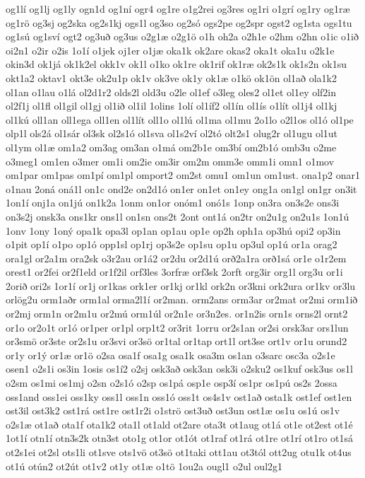 {og1lí
og1lj
og1ly
ogn1d
og1ní
ogr4
og1re
o1g2rei
og3res
og1ri
o1grí
og1ry
og1ræ
og1rö
og3sj
og2ska
og2s1kj
ogs1l
og3so
og2só
ogs2pe
og2spr
ogst2
og1sta
ogs1tu
og1sú
og1sví
ogt2
og3uð
og3us
o2g1æ
o2g1ö
o1h
oh2a
o2h1e
o2hm
o2hn
o1ic
o1ið
oi2n1
o2ir
o2is
1o1í
o1jek
oj1er
o1jæ
oka1k
ok2are
okas2
oka1t
oka1u
o2k1e
okin3d
ok1já
ok1k2el
okk1v
ok1l
o1ko
ok1re
ok1rif
ok1ræ
ok2s1k
ok1s2n
ok1su
okt1a2
oktav1
okt3e
ok2u1p
ok1v
ok3ve
ok1y
ok1æ
o1kö
ok1ön
ol1að
ola1k2
ol1an
o1lau
o1lá
ol2d1r2
olds2l
old3u
o2le
ol1ef
o3leg
oles2
ol1et
ol1ey
olf2in
ol2f1j
ol1fl
ol1gil
ol1gj
ol1ið
ol1il
1olins
1olí
ol1íf2
ol1ín
ol1ís
o1lít
ol1j4
ol1kj
ol1kú
oll1an
oll1ega
oll1en
ol1lít
oll1o
ol1lú
ol1ma
ol1mu
2o1lo
o2l1os
ol1ó
ol1pe
olp1l
ols2á
ol1sár
ol3sk
ol2s1ó
ol1sva
ol1s2ví
ol2tó
olt2s1
olug2r
ol1ugu
ol1ut
ol1ym
ol1æ
om1a2
om3ag
om3an
o1má
om2b1e
om3bí
om2b1ó
omb3u
o2me
o3meg1
om1en
o3mer
om1i
om2ie
om3ir
om2m
omm3e
omm1i
omn1
o1mov
om1par
om1pas
om1pí
om1pl
omport2
om2st
omu1
om1un
om1ust.
ona1p2
onar1
o1nau
2oná
oná1l
on1c
ond2e
on2d1ó
on1er
on1et
on1ey
ong1a
on1gl
on1gr
on3it
1on1í
onj1a
on1jú
on1k2a
1onm
on1or
onóm1
onó1s
1onp
on3ra
on3s2e
ons3i
on3s2j
onsk3a
ons1kr
ons1l
on1sn
ons2t
2ont
ont1á
on2tr
on2u1g
on2u1s
1on1ú
1onv
1ony
1oný
opa1k
opa3l
op1an
op1au
op1e
op2h
oph1a
op3hú
opi2
op3in
o1pit
op1í
o1po
op1ó
opp1sl
op1rj
op3s2e
op1su
op1u
op3ul
op1ú
or1a
orag2
ora1gl
or2a1m
ora2sk
o3r2au
or1á2
or2du
or2d1ú
orð2a1ra
orð1sá
or1e
o1r2em
orest1
or2fei
or2f1eld
or1f2il
orf3les
3orfræ
orf3sk
2orft
org3ir
org1l
org3u
or1i
2orið
ori2s
1or1í
or1j
or1kas
ork1er
or1kj
or1kl
ork2n
or3kni
ork2ura
or1kv
or3lu
orlög2u
orm1aðr
orm1al
orma2l1í
or2man.
orm2ans
orm3ar
or2mat
or2mi
orm1ið
or2mj
orm1n
or2m1u
or2mú
orm1úl
or2n1e
or3n2es.
or1n2is
orn1s
orns2l
ornt2
or1o
or2o1t
or1ó
or1per
or1pl
orp1t2
or3rit
1orru
or2s1an
or2si
orsk3ar
ors1lun
or3smö
or3ste
or2s1u
or3svi
or3sö
or1tal
or1tap
ort1l
ort3se
ort1v
or1u
orund2
or1y
or1ý
or1æ
or1ö
o2sa
osa1f
osa1g
osa1k
osa3m
os1an
o3sarc
osc3a
o2s1e
osen1
o2s1i
os3in
1osis
os1í2
o2sj
osk3að
osk3an
osk3i
o2sku2
os1kuf
osk3us
os1l
o2sm
os1mi
os1mj
o2sn
o2s1ó
o2sp
os1pá
osp1e
osp3í
os1pr
os1pú
os2s
2ossa
oss1and
oss1ei
oss1ky
oss1l
oss1n
oss1ó
oss1t
os4s1v
ost1að
osta1k
ost1ef
ost1en
ost3il
ost3k2
ost1rá
ost1re
ost1r2i
o1strö
ost3uð
ost3un
ost1æ
os1u
os1ú
os1v
o2s1æ
ot1að
ota1f
ota1k2
ota1l
ot1ald
ot2are
ota3t
ot1aug
ot1á
ot1e
ot2est
ot1é
1ot1í
otn1í
otn3s2k
otn3st
oto1g
ot1or
ot1ót
ot1raf
ot1rá
ot1re
ot1rí
ot1ro
ot1sá
ot2s1ei
ot2sl
ots1li
ot1sve
ots1vö
ot3sö
ot1taki
ott1au
ot3tól
ott2ug
otu1k
ot4us
ot1ú
otún2
ot2út
ot1v2
ot1y
ot1æ
o1tö
1ou2a
ougl1
o2ul
oul2g1
}

